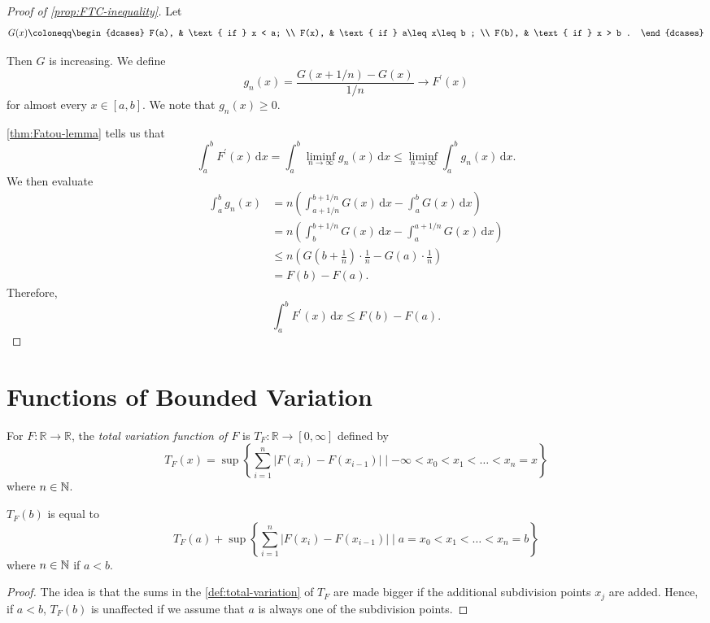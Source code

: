 \begin{proof}[Proof of \autoref{prop:FTC-inequality}]
	Let
	\[
		G(x)\coloneqq \begin{dcases}
			F(a), & \text{ if } x < a;          \\
			F(x), & \text{ if } a\leq x\leq b ; \\
			F(b), & \text{ if } x > b .
		\end{dcases}
	\]

	Then \(G\) is increasing. We define
	\[
		g_n(x) = \frac{G(x+1/n)- G(x)}{1/n} \to F^\prime (x)
	\]
	for almost every \(x \in [a,b]\). We note that \(g_n(x) \geq 0\).

	\autoref{thm:Fatou-lemma} tells us that
	\[
		\int_a^b F^\prime (x) \,\mathrm{d} x = \int_a^b \liminf_{n \to \infty} g_n(x) \,\mathrm{d} x \leq \liminf_{n \to \infty} \int_a^b g_n(x) \,\mathrm{d} x.
	\]
	We then evaluate
	\[
		\begin{split}
			\int_a^b g_n(x) &= n\left( \int_{a+1/n}^{b+1/n} G(x) \,\mathrm{d} x - \int_a^b G(x) \,\mathrm{d} x \right)  \\
			&= n\left( \int_b^{b+1/n} G(x) \,\mathrm{d} x - \int_a^{a+1/n} G(x) \,\mathrm{d} x \right) \\
			&\leq n\left( G\left( b + \frac{1}{n} \right) \cdot \frac{1}{n} - G(a) \cdot \frac{1}{n}  \right) \\
			&= F(b) - F(a).
		\end{split}
	\]
	Therefore,
	\[
		\int_a^b F^\prime (x) \,\mathrm{d} x \leq F(b) - F(a).
	\]
\end{proof}

\section{Functions of Bounded Variation}
\begin{definition}\label{def:total-variation-function}
	For \(F \colon \mathbb{R} \to \mathbb{R}\), the \emph{total variation function of \(F\)} is \(T_F \colon \mathbb{R} \to [0,\infty]\) defined by
	\[
		T_F(x) = \sup \left\{\sum_{i=1}^n \left\vert F(x_i) - F(x_{i-1}) \right\vert \mid -\infty < x_0 < x_1 < \ldots < x_n = x\right\}
	\]
	where \(n \in \mathbb{\MakeUppercase{n}}\).
\end{definition}

\begin{lemma}
	\(T_F(b)\) is equal to
	\[
		T_F(a) + \sup \left\{\sum_{i=1}^n \left\vert F(x_i) - F(x_{i-1}) \right\vert \mid a = x_0 < x_1 < \ldots < x_n = b\right\}
	\]
	where \(n \in \mathbb{\MakeUppercase{n}}\) if \(a < b\).
\end{lemma}
\begin{proof}
	The idea is that the sums in the \autoref{def:total-variation} of \(T_F\) are made bigger if the additional subdivision points \(x_{j} \) are added. Hence,
	if \(a <b\), \(T_F(b)\) is unaffected if we assume that \(a\) is always one of the subdivision points.
\end{proof}

